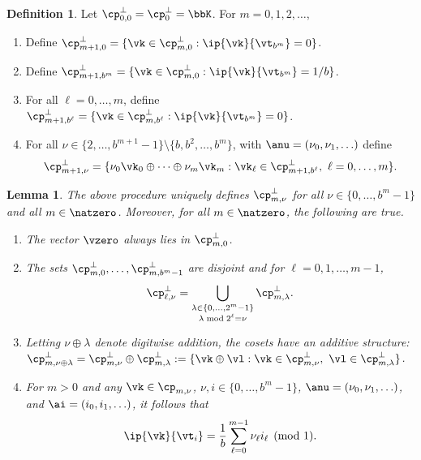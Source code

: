 \documentclass[]{elsarticle}
\newtheorem{lem}{Lemma}
\theoremstyle{definition}
\newtheorem{defin}{Definition}
\begin{document}
\begin{defin} \label{noodefalgo} Let $\cp_{0,0}^{\perp}=\cp_{0}^{\perp}=\bbK$.  For $m=0, 1, 2, \ldots$, 
\begin{enumerate}
\renewcommand{\labelenumi}{\alph{enumi})}
\item Define $\cp_{m+1,0}^{\perp}=\{\vk \in \cp_{m,0}^{\perp} : \ip{\vk}{\vt_{b^{m}}}=0\}$.
\item Define $\cp_{m+1,b^{m}}^{\perp}=\{\vk \in \cp_{m,0}^{\perp} : \ip{\vk}{\vt_{b^{m}}}=1/b\}$.  
\item For all $\ell=0, \ldots, m$, define $\cp_{m+1,b^{\ell}}^{\perp}=\{\vk \in \cp_{m,b^{\ell}}^{\perp} : \ip{\vk}{\vt_{b^{m}}}=0\}$.
\item For all $\nu \in \{2, \ldots, b^{m+1}-1\} \setminus \{b, b^2, \ldots, b^m\}$, with $\anu=(\nu_0, \nu_1, \ldots)$ define 
\[
\cp_{m+1,\nu}^{\perp}= \{\nu_0\vk_0 \oplus \cdots \oplus \nu_{m} \vk_{m}  : \vk_\ell \in \cp_{m+1,b^{\ell}}^{\perp},\  \ell=0, \ldots, m\}.
\]
\end{enumerate}
\end{defin}

\begin{lem} \label{cosetlem} The above procedure uniquely defines $\cp_{m,\nu}^{\perp}$  for all $\nu \in \{0, \ldots, b^m-1\}$ and all $m \in \natzero$.  Moreover, for all $m \in \natzero$, the following are true.
\begin{enumerate}
\renewcommand{\labelenumi}{\alph{enumi})}

\item The vector $\vzero$ always lies in $\cp_{m,0}^{\perp}$.

\item The sets $\cp_{m,0}^{\perp}, \ldots, \cp_{m,b^m-1}^{\perp}$ are disjoint and for $\ell=0, 1, \ldots, m-1$,
\[
\cp_{\ell, \nu}^{\perp} = \bigcup_{\substack{\lambda \in \{0, \ldots, 2^{m}-1\} \\ \lambda \bmod 2^\ell = \nu}} \cp_{m,\lambda}^{\perp}.
\]

\item Letting $\nu \oplus \lambda$ denote digitwise addition, the cosets have an additive structure: $\cp_{m,\nu \oplus \lambda}^{\perp} = \cp_{m,\nu}^{\perp} \oplus \cp_{m,\lambda}^{\perp} := \{\vk \oplus \vl :  \vk \in \cp_{m,\nu}^{\perp},\ \vl \in \cp_{m,\lambda}^{\perp}\}$.

\item For $m>0$ and any $\vk \in \cp_{m,\nu}$, $\nu, i \in \{0, \ldots, b^m-1\}$,  $\anu=(\nu_0, \nu_1, \ldots)$, and $\ai=(i_0, i_1, \ldots)$, it follows that 
\begin{equation} \label{nuwisum}
\ip{\vk}{\vt_i} = \frac 1 b \sum_{\ell=0}^{m-1} \nu_\ell i_{\ell} \pmod 1.
\end{equation}

\end{enumerate}
\end{lem}
\end{document}
